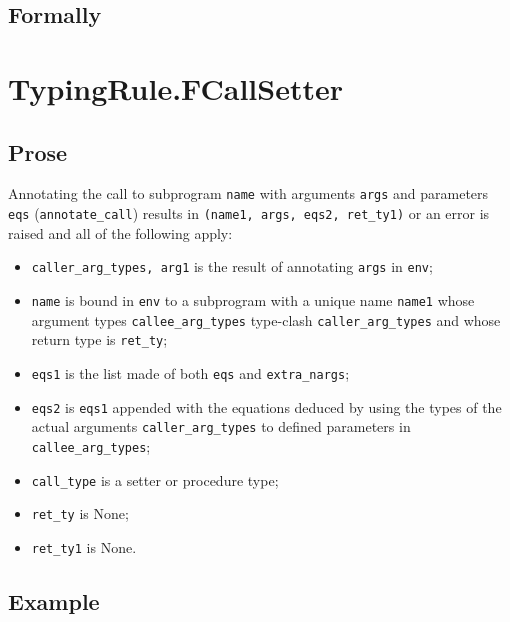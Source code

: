 \documentclass{book}
\begin{document}
\begin{emptyformal}
    \subsection{Formally}
\end{emptyformal}



\section{TypingRule.FCallSetter \label{sec:TypingRule.FCallSetter}}

  \subsection{Prose}
  Annotating the call to subprogram \texttt{name} with arguments \texttt{args}
  and parameters \texttt{eqs} (\texttt{annotate\_call}) results in
  \texttt{(name1, args, eqs2, ret\_ty1)} or an error is raised and all of the
  following apply:
  \begin{itemize}
    \item \texttt{caller\_arg\_types, arg1} is the result of annotating
      \texttt{args} in \texttt{env};
    \item \texttt{name} is bound in \texttt{env} to a subprogram with a unique
      name \texttt{name1} whose argument types \texttt{callee\_arg\_types}
      type-clash \texttt{caller\_arg\_types} and whose return type is
      \texttt{ret\_ty};
    \item \texttt{eqs1} is the list made of both \texttt{eqs} and
      \texttt{extra\_nargs};
    \item \texttt{eqs2} is \texttt{eqs1} appended with the equations deduced by
      using the types of the actual arguments \texttt{caller\_arg\_types} to
      defined parameters in \texttt{callee\_arg\_types};
    \item \texttt{call\_type} is a setter or procedure type;
    \item \texttt{ret\_ty} is None;
    \item \texttt{ret\_ty1} is None.
  \end{itemize}

  \subsection{Example}
\end{document}
